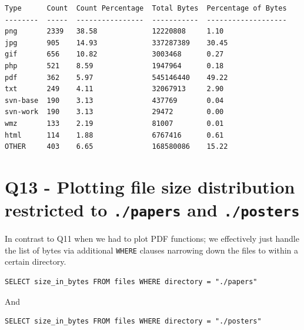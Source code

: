 \documentclass{article}
\begin{document}
\vspace{20pt}
\begin{small}
\begin{verbatim}
Type      Count  Count Percentage  Total Bytes  Percentage of Bytes
--------  -----  ----------------  -----------  -------------------
png       2339   38.58             12220808     1.10               
jpg       905    14.93             337287389    30.45              
gif       656    10.82             3003468      0.27               
php       521    8.59              1947964      0.18               
pdf       362    5.97              545146440    49.22              
txt       249    4.11              32067913     2.90               
svn-base  190    3.13              437769       0.04               
svn-work  190    3.13              29472        0.00               
wmz       133    2.19              81007        0.01               
html      114    1.88              6767416      0.61               
OTHER     403    6.65              168580086    15.22              
\end{verbatim}
\end{small}

\newpage

\section*{Q13 - Plotting file size distribution restricted to \texttt{./papers} and \texttt{./posters}}
In contrast to Q11 when we had to plot PDF functions; we effectively just handle the list of bytes via additional \texttt{WHERE} clauses narrowing down the files to within a certain directory.

\begin{small}
\begin{verbatim}
SELECT size_in_bytes FROM files WHERE directory = "./papers"
\end{verbatim}
\end{small}

And

\begin{small}
\begin{verbatim}
SELECT size_in_bytes FROM files WHERE directory = "./posters"
\end{verbatim}
\end{small}
\end{document}
